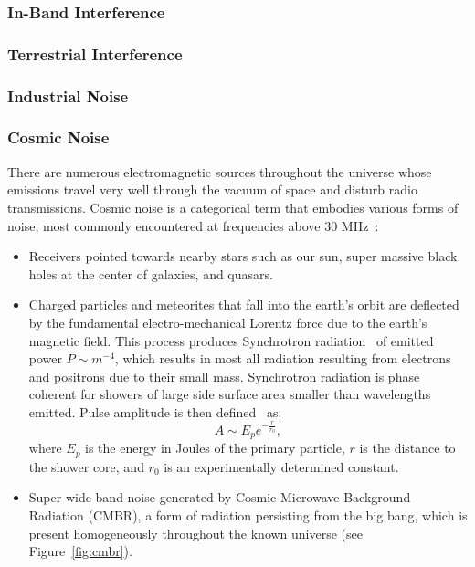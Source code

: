 \subsubsection{In-Band Interference}
\subsubsection{Terrestrial Interference}
\label{terrestrial}
\subsubsection{Industrial Noise}
\subsubsection{Cosmic Noise}
There are numerous electromagnetic sources throughout the universe whose emissions travel very well through the vacuum of space and disturb radio transmissions. Cosmic noise is a categorical term that embodies various forms of noise, most commonly encountered at frequencies above 30 MHz~\cite{cosmic}:
\begin{itemize}
\item Receivers pointed towards nearby stars such as our sun, super massive black holes at the center of galaxies, and quasars.
\item Charged particles and meteorites that fall into the earth's orbit are deflected by the fundamental electro-mechanical Lorentz force due to the earth's magnetic field. This process produces Synchrotron radiation~\cite{cosmic} of emitted power $P \sim m^{-4}$, which results in most all radiation resulting from electrons and positrons due to their small mass. Synchrotron radiation is phase coherent for showers of large side surface area smaller than wavelengths emitted. Pulse amplitude is then defined~\cite{cosmic} as:
\begin{equation}
\label{eq:synchrad}
A \sim E_p e^{-\frac{r}{r_0}},
\end{equation}
where $E_p$ is the energy in Joules of the primary particle, $r$ is the distance to the shower core, and $r_0$ is an experimentally determined constant.
\item Super wide band noise generated by Cosmic Microwave Background Radiation (CMBR), a form of radiation persisting from the big bang, which is present homogeneously throughout the known universe (see Figure~\ref{fig:cmbr}).
\end{itemize}

